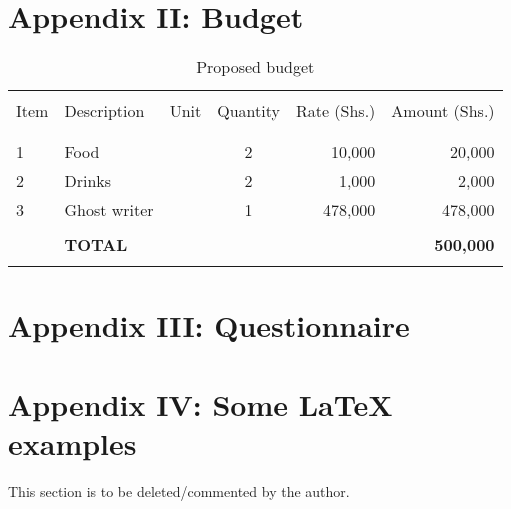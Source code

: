 \clearpage  %
\section*{Appendix II: Budget}
%

\begin{table}[!h]
	\begin{center}
		\caption{\label{tbl:Budget}Proposed budget}
		\begin{tabular}{llccrr}
			\hline \\
				Item & Description    & Unit      & Quantity  & Rate (Shs.) & Amount (Shs.)    \\
			\\
			\hline \\				
				1    & Food           &           & 2         & 10,000      & 20,000           \\
				2    & Drinks         &           & 2         & 1,000       & 2,000            \\
				3    & Ghost writer   &           & 1         & 478,000     & 478,000          \\
			\\
				& \textbf{TOTAL} & \textbf{} & \textbf{} & \textbf{}   & \textbf{500,000}		\\
			\hline \\ 
		\end{tabular}
	\end{center}
\end{table}

\clearpage  %
\section*{Appendix III: Questionnaire}
%

\clearpage  %
\section*{Appendix IV: Some \LaTeX{} examples}

This section is to be deleted/commented by the author.
